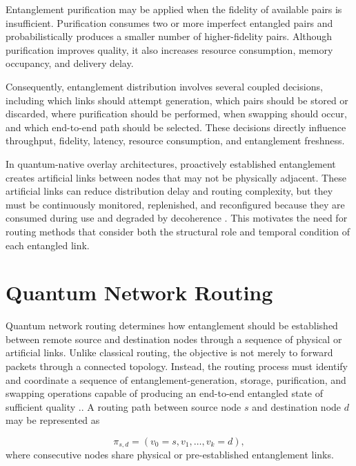 Entanglement purification may be applied when the fidelity of available pairs is insufficient. Purification consumes two or more imperfect entangled pairs and probabilistically produces a smaller number of higher-fidelity pairs. Although purification improves quality, it also increases resource consumption, memory occupancy, and delivery delay.

Consequently, entanglement distribution involves several coupled decisions, including which links should attempt generation, which pairs should be stored or discarded, where purification should be performed, when swapping should occur, and which end-to-end path should be selected. These decisions directly influence throughput, fidelity, latency, resource consumption, and entanglement freshness.

In quantum-native overlay architectures, proactively established entanglement creates artificial links between nodes that may not be physically adjacent. These artificial links can reduce distribution delay and routing complexity, but they must be continuously monitored, replenished, and reconfigured because they are consumed during use and degraded by decoherence \cite{caleffi2025quantumarchitecture}. This motivates the need for routing methods that consider both the structural role and temporal condition of each entangled link.
\section{Quantum Network Routing}
Quantum network routing determines how entanglement should be established between remote source and destination nodes through a sequence of physical or artificial links. Unlike classical routing, the objective is not merely to forward packets through a connected topology. Instead, the routing process must identify and coordinate a sequence of entanglement-generation, storage, purification, and swapping operations capable of producing an end-to-end entangled state of sufficient quality \cite{pant2019routing,lee2022router,halder2024optimal}..
\cite{pant2019routing,lee2022router,halder2024optimal}
A routing path between source node $s$ and destination node $d$ may be represented as

\begin{equation}
    \pi_{s,d}
    =
    \left(
    v_0=s,
    v_1,
    \ldots,
    v_k=d
    \right),
\end{equation}
where consecutive nodes share physical or pre-established entanglement links.

